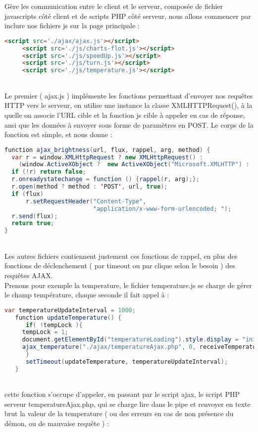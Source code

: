 Gère les communication entre le client et le serveur, composée de fichier javascripts côté client et de scripts PHP côté serveur, nous allons commencer par inclure nos fichiers js sur la page principale :\\
\begin{DDbox}{\linewidth}
\begin{lstlisting}[language=html]
  <script src='./ajax/ajax.js'></script>
	 <script src='./js/charts-flot.js'></script>
	 <script src='./js/speedUp.js'></script>
	 <script src='./js/turn.js'></script>
	 <script src='./js/temperature.js'></script>
\end{lstlisting}
\end{DDbox}
\\
Le premier ( ajax.js ) implémente les fonctions permettant d'envoyer nos requêtes HTTP vers le serveur, on utilise une instance la classe XMLHTTPRequest(), à la quelle on associe l'URL cible et la fonction js cible à appeler en cas de réponse, ansi que les données à envoyer sous forme de paramètres en POST. Le corps de la fonction est simple, et nous donne :\\
\begin{DDbox}{\linewidth}
\begin{lstlisting}[language=java]
  function ajax_brightness(url, flux, rappel, arg, method) {
  var r = window.XMLHttpRequest ? new XMLHttpRequest() :
    (window.ActiveXObject ?  new ActiveXObject("Microsoft.XMLHTTP") : '');
  if (!r) return false;
  r.onreadystatechange = function () {rappel(r, arg);};
  r.open(method ? method : 'POST', url, true);
  if (flux)
      r.setRequestHeader("Content-Type", 
                         "application/x-www-form-urlencoded; ");
  r.send(flux);
  return true;
}
\end{lstlisting}
\end{DDbox}
\\
Les autres fichiers contiennent justement ces fonctions de rappel, en plus des fonctions de déclenchement ( par timeout ou par clique selon le besoin ) des requêtes AJAX.\\
Prenons pour exemple la temperature, le fichier temperature.js se charge de gérer le champ température, chaque seconde il fait appel à :\\
\begin{DDbox}{\linewidth}
\begin{lstlisting}[language=java]
var temperatureUpdateInterval = 1000;
   function updateTemperature() {
      if( !tempLock ){
	 tempLock = 1;
	 document.getElementById("temperatureLoading").style.display = "initial";
	 ajax_temperature("./ajax/temperatureAjax.php", 0, receiveTemperature, 0);
      }
      setTimeout(updateTemperature, temperatureUpdateInterval);
   }
\end{lstlisting}
\end{DDbox}
\\
cette fonction s'occupe d'appeler, en passant par le script ajax, le script PHP serveur temperatureAjax.php, qui se charge lire dans le pipe et renvoyer en texte brut la valeur de la temperature ( ou des erreurs en cas de non présence du démon, ou de mauvaise requête ) :

